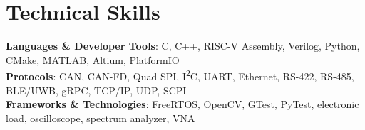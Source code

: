 \documentclass[letterpaper,11pt]{article}
\begin{document}
%
\section{Technical Skills}
\begin{itemize}[leftmargin=0.15in, label={}]
    \small{\item{
    \textbf{Languages \& Developer Tools}{: C, C++, RISC-V Assembly, Verilog, Python, CMake, MATLAB, Altium, PlatformIO} \\
    \textbf{Protocols}{: CAN, CAN-FD, Quad SPI, I\textsuperscript{2}C, UART, Ethernet, RS-422, RS-485, BLE/UWB, gRPC, TCP/IP, UDP, SCPI} \\
    \textbf{Frameworks \& Technologies}{: FreeRTOS, OpenCV, GTest, PyTest, electronic load, oscilloscope, spectrum analyzer, VNA} \\
    }}
\end{itemize}
\vspace{-16pt}


\end{document}

